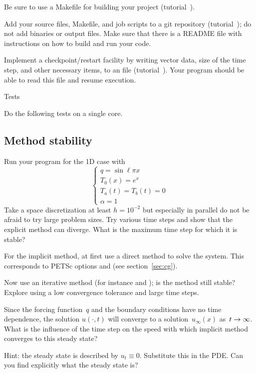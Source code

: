 Be sure to use a Makefile for building your project (tutorial~).

Add your source files, Makefile, and job scripts to a git repository
(tutorial~); do not add binaries or output files. Make
sure that there is a README
file with instructions on how to build and run your code.

Implement a checkpoint/restart facility by writing vector data, size
of the time step, and other necessary items, to an  file
(tutorial~). Your program should be able to read this
file and resume execution.

 {Tests}

Do the following tests on a single core.

\subsection*{Method stability}

Run your program for the 1D case with 
\[
\begin{cases}
  q=\sin\ell\pi x\\ T_0(x)=e^x\\ T_a(t)=T_b(t)=0\\ \alpha=1
\end{cases}
\]
Take a space discretization at least $h=10^{-2}$ but especially in
parallel do not be afraid to try large problem sizes. Try various 
time steps
and show that
the explicit method can diverge. What is the maximum time step for
which it is stable? 

For the implicit method, at first use a direct method to solve the
system.
This corresponds to PETSc options  and  (see
section~\ref{sec:cg}).

Now use an iterative method (for instance  and );
is the method still stable? Explore using a low convergence tolerance
and large time steps. 

Since the forcing function~$q$ and the boundary conditions have no
time dependence, the solution $u(\cdot,t)$ will converge to a
 solution~$u_\infty(x)$
as~$t\rightarrow\nobreak\infty$. What is the influence of the time step on the
speed with which implicit method converges to this steady state?

Hint: the steady state is described by $u_t\equiv0$. Substitute this
in the \ac{PDE}. Can you find explicitly what the steady state is?

